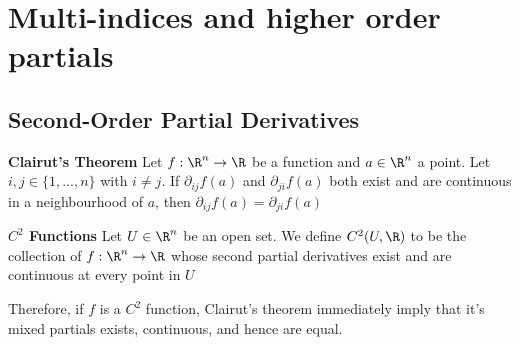 \documentclass[11pt]{article}
\begin{document}
\section{Multi-indices and higher order partials}

\subsection{Second-Order Partial Derivatives}


\begin{theorem}
  \label{Clairut's Theorem}
  \textbf{Clairut's Theorem} Let $f:\R^n \rightarrow \R$ be a function and $a\in\R^n$ a point. Let $i,j \in \{ 1, ..., n \}$  with $i\neq j$. If $\partial_{ij} f(a)$ and $\partial_{ji} f(a)$ both exist and are continuous in a neighbourhood of $a$, then $\partial_{ij} f(a) = \partial_{ji} f(a)$
\end{theorem}

\begin{defn}
  \label{C2 functions} \textbf{$C^2$ Functions} Let $U\in\R^n$ be an open set. We define $C^2(U, \R)$ to be the collection of $f:\R^n \rightarrow \R$ whose second partial derivatives exist and are continuous at every point in $U$

  \begin{rem}
    Therefore, if $f$ is a $C^2$ function, Clairut's theorem immediately imply that it's mixed partials exists, continuous, and hence are equal.
  \end{rem}
\end{defn}
\end{document}
